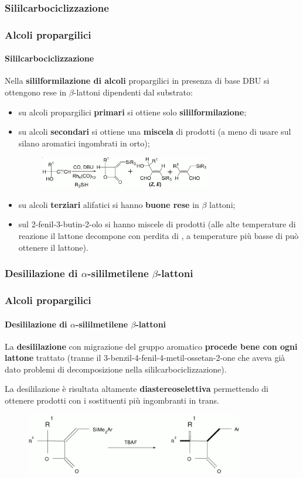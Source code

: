 \subsubsection{Sililcarbociclizzazione}\begin{frame}\frametitle{Alcoli propargilici}\framesubtitle{Sililcarbociclizzazione}
Nella {\bf sililformilazione di alcoli} propargilici in presenza di base DBU si ottengono rese in $\beta$-lattoni dipendenti dal substrato:
\begin{itemize}
 \item su alcoli propargilici {\bf primari} si ottiene solo {\bf sililformilazione};
 \item su alcoli {\bf secondari} si ottiene una {\bf miscela} di prodotti (a meno di usare sul silano aromatici ingombrati in orto);
\begin{figure}{\includegraphics[width=0.7\textwidth]{img/substrati/alcol-secondari.png}}\end{figure}
 \item su alcoli {\bf terziari} alifatici si hanno {\bf buone rese} in $\beta$ lattoni;
 \item sul 2-fenil-3-butin-2-olo si hanno miscele di prodotti (alle alte temperature di reazione il lattone decompone con perdita di , a temperature più basse di può ottenere il lattone).
\end{itemize}
\end{frame}



\subsubsection{Desililazione di $\alpha$-sililmetilene $\beta$-lattoni}\begin{frame}\frametitle{Alcoli propargilici}\framesubtitle{Desililazione di $\alpha$-sililmetilene $\beta$-lattoni}
                                                             La {\bf desililazione} con migrazione del gruppo aromatico {\bf procede bene con ogni lattone} trattato (tranne il 3-benzil-4-fenil-4-metil-ossetan-2-one che aveva già dato problemi di decomposizione nella sililcarbociclizzazione).

La desililazione è risultata altamente {\bf diastereoselettiva} permettendo di ottenere prodotti con i sostituenti più ingombranti in trans.
\begin{figure}{\includegraphics[width=0.85\textwidth]{img/substrati/alcol-desililcicl.png}}\end{figure}
\end{frame}

